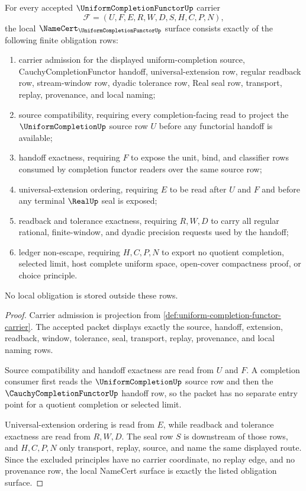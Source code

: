 \begin{theorem}
\label{thm:uniform-completion-functor-namecert-obligations}
For every accepted $\UniformCompletionFunctorUp$ carrier
$$
\mathcal{F}=(U,F,E,R,W,D,S,H,C,P,N),
$$
the local $\NameCert_{\UniformCompletionFunctorUp}$ surface consists exactly of the following finite obligation rows:
\begin{enumerate}
\item carrier admission for the displayed uniform-completion source, CauchyCompletionFunctor handoff, universal-extension row, regular readback row, stream-window row, dyadic tolerance row, Real seal row, transport, replay, provenance, and local naming;
\item source compatibility, requiring every completion-facing read to project the $\UniformCompletionUp$ source row $U$ before any functorial handoff is available;
\item handoff exactness, requiring $F$ to expose the unit, bind, and classifier rows consumed by completion functor readers over the same source row;
\item universal-extension ordering, requiring $E$ to be read after $U$ and $F$ and before any terminal $\RealUp$ seal is exposed;
\item readback and tolerance exactness, requiring $R,W,D$ to carry all regular rational, finite-window, and dyadic precision requests used by the handoff;
\item ledger non-escape, requiring $H,C,P,N$ to export no quotient completion, selected limit, host complete uniform space, open-cover compactness proof, or choice principle.
\end{enumerate}
No local obligation is stored outside these rows.
\end{theorem}
\begin{proof}
Carrier admission is projection from \autoref{def:uniform-completion-functor-carrier}. The accepted packet displays exactly the source, handoff, extension, readback, window, tolerance, seal, transport, replay, provenance, and local naming rows.

Source compatibility and handoff exactness are read from $U$ and $F$. A completion consumer first reads the $\UniformCompletionUp$ source row and then the $\CauchyCompletionFunctorUp$ handoff row, so the packet has no separate entry point for a quotient completion or selected limit.

Universal-extension ordering is read from $E$, while readback and tolerance exactness are read from $R,W,D$. The seal row $S$ is downstream of those rows, and $H,C,P,N$ only transport, replay, source, and name the same displayed route. Since the excluded principles have no carrier coordinate, no replay edge, and no provenance row, the local NameCert surface is exactly the listed obligation surface.
\end{proof}

